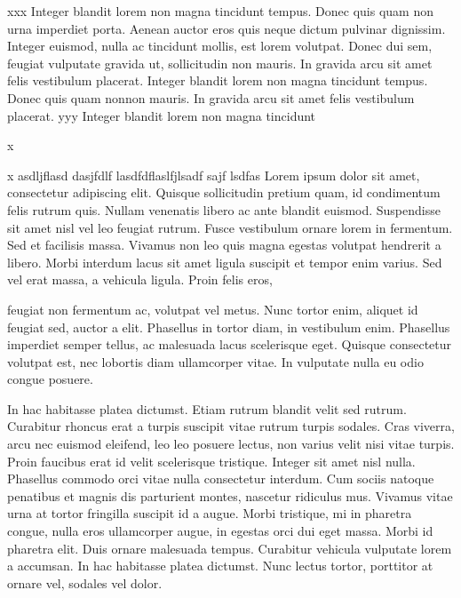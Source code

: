 \startrule
xxx Integer blandit lorem non magna tincidunt tempus. Donec quis quam non
urna imperdiet porta. Aenean auctor eros quis neque dictum pulvinar
dignissim. Integer euismod, nulla ac tincidunt mollis, est lorem
volutpat. Donec dui sem, feugiat vulputate gravida ut, sollicitudin
non mauris. In gravida arcu sit amet felis vestibulum placerat.
Integer blandit lorem non magna tincidunt tempus. Donec quis quam nonnon mauris. In gravida arcu sit amet felis vestibulum placerat.
yyy Integer blandit lorem non magna tincidunt 

\endrule

x

x
asdljflasd dasjfdlf lasdfdflaslfjlsadf sajf lsdfas Lorem ipsum dolor
sit amet, consectetur adipiscing elit. Quisque sollicitudin pretium
quam, id condimentum felis rutrum quis. Nullam venenatis libero ac
ante blandit euismod. Suspendisse sit amet nisl vel leo feugiat
rutrum. Fusce vestibulum ornare lorem in fermentum. Sed et facilisis
massa. Vivamus non leo quis magna egestas volutpat hendrerit a
libero. Morbi interdum lacus sit amet ligula suscipit et tempor enim
varius. Sed vel erat massa, a vehicula ligula. Proin felis eros,

feugiat non fermentum ac, volutpat vel metus. Nunc tortor enim,
aliquet id feugiat sed, auctor a elit. Phasellus in tortor diam, in
vestibulum enim. Phasellus imperdiet semper tellus, ac malesuada lacus
scelerisque eget. Quisque consectetur volutpat est, nec lobortis diam
ullamcorper vitae. In vulputate nulla eu odio congue posuere.

In hac habitasse platea dictumst. Etiam rutrum blandit velit sed
rutrum. Curabitur rhoncus erat a turpis suscipit vitae rutrum turpis
sodales. Cras viverra, arcu nec euismod eleifend, leo leo posuere
lectus, non varius velit nisi vitae turpis. Proin faucibus erat id
velit scelerisque tristique. Integer sit amet nisl nulla. Phasellus
commodo orci vitae nulla consectetur interdum. Cum sociis natoque
penatibus et magnis dis parturient montes, nascetur ridiculus
mus. Vivamus vitae urna at tortor fringilla suscipit id a augue. Morbi
tristique, mi in pharetra congue, nulla eros ullamcorper augue, in
egestas orci dui eget massa. Morbi id pharetra elit. Duis ornare
malesuada tempus. Curabitur vehicula vulputate lorem a accumsan. In
hac habitasse platea dictumst. Nunc lectus tortor, porttitor at ornare
vel, sodales vel dolor.

